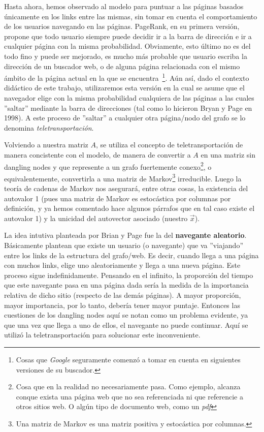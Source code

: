 \par Hasta ahora, hemos observado al modelo para puntuar a las p\'aginas basados
\'unicamente en los links entre las mismas, sin tomar en cuenta el
comportamiento de los usuarios navegando en las p\'aginas. PageRank, en su
primera versi\'on, propone que todo usuario siempre puede decidir ir a la barra
de direcci\'on e ir a cualquier p\'agina con la misma probabilidad. Obviamente,
esto \'ultimo no es del todo fino y puede ser mejorado, es mucho m\'as probable
que usuario escriba la direcci\'on de un buscador web, o de alguna p\'agina
relacionada con el mismo \'ambito de la p\'agina actual en la que se
encuentra~\footnote{Cosas que \emph{Google} seguramente comenz\'o a tomar en
cuenta en siguientes versiones de su buscador.}. A\'un as\'i, dado el contexto
did\'actico de este trabajo, utilizaremos esta versi\'on en la cual se asume que
el navegador elige con la misma probabilidad cualquiera de las p\'aginas a las
cuales ''saltar'' mediante la barra de direcciones (tal como lo hicieron Bryan y
Page en 1998).  A este proceso de ''saltar'' a cualquier otra p\'agina/nodo del
grafo se lo denomina \emph{teletransportaci\'on}.

\par Volviendo a nuestra matriz $A$, se utiliza el concepto de
teletransportaci\'on de manera concistente con el modelo, de manera de convertir
a $A$ en una matriz sin dangling nodes y que represente a un grafo fuertemente
conexo\footnote{Cosa que en la realidad no necesariamente pasa. Como ejemplo,
alcanza conque exista una p\'agina web que no sea referenciada ni que referencie
a otros sitios web. O alg\'un tipo de documento web, como un \emph{pdf}}, o
equivalentemente, convertirla a una matriz de Markov\footnote{Una matriz de
Markov es una matriz positiva y estoc\'astica por columnas.} irreducible. Luego
la teor\'ia de cadenas de Markov nos asegurar\'a, entre otras cosas, la
existencia del autovalor 1 (pues una matriz de Markov es estoc\'astica por
columnas por definici\'on, y ya hemos comentado hace algunos p\'arrafos que en
tal caso existe el autovalor 1) y la unicidad del autovector asociado (nuestro
$\vec{x}$).

\par La idea intutiva planteada por Brian y Page fue la del \textbf{navegante
aleatorio}. B\'asicamente plantean que existe un usuario (o navegante) que va
''viajando'' entre los links de la estructura del grafo/web. Es decir, cuando
llega a una p\'agina con muchos links, elige uno aleatoriamente y llega a una
nueva p\'agina. Este proceso sigue indefinidamente. Pensando en el infinito, la
proporci\'on del tiempo que este navegante pasa en una p\'agina dada ser\'ia la
medida de la importancia relativa de dicho sitio (respecto de las dem\'as
p\'aginas). A mayor proporci\'on, mayor importancia, por lo tanto, deber\'ia
tener mayor puntaje. Entonces las cuestiones de los dangling nodes aqu\'i se
notan como un problema evidente, ya que una vez que llega a uno de ellos, el
navegante no puede continuar. Aqu\'i se utiliz\'o la teletransportaci\'on para
solucionar este inconveniente.


